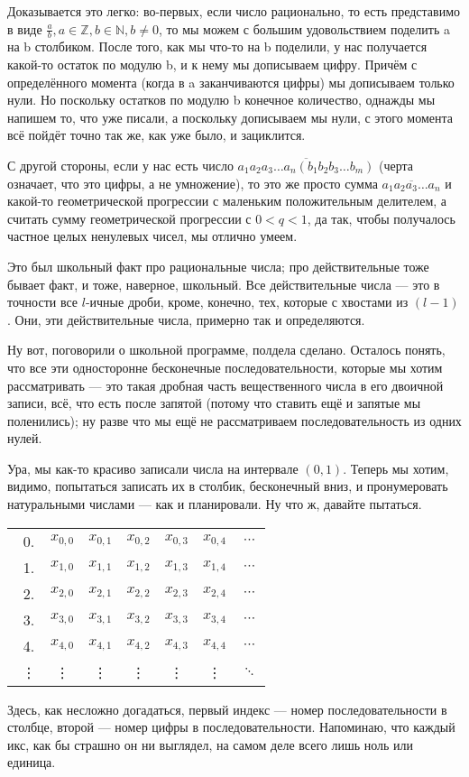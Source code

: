 \documentclass[12pt, onecolumn]{report}
\begin{document}
Доказывается это легко: во-первых, если число рационально, то есть представимо в виде $\frac{a}{b}, a \in \mathbb Z, b \in \mathbb N, b \neq 0$, то мы можем с большим удовольствием поделить a на b столбиком. После того, как мы что-то на b поделили, у нас получается какой-то остаток по модулю b, и к нему мы дописываем цифру. Причём с определённого момента (когда в a заканчиваются цифры) мы дописываем только нули. Но поскольку остатков по модулю b конечное количество, однажды мы напишем то, что уже писали, а поскольку дописываем мы нули, с этого момента всё пойдёт точно так же, как уже было, и зациклится.

С другой стороны, если у нас есть число $\overline{a_1 a_2 a_3 \ldots a_n (b_1 b_2 b_3 \ldots b_m)}$ (черта означает, что это цифры, а не умножение), то это же просто сумма $\overline{a_1 a_2 a_3 \ldots a_n}$ и какой-то геометрической прогрессии с маленьким положительным делителем, а считать сумму геометрической прогрессии с $0 < q < 1$, да так, чтобы получалось частное целых ненулевых чисел, мы отлично умеем.

Это был школьный факт про рациональные числа; про действительные тоже бывает факт, и тоже, наверное, школьный. Все действительные числа --- это в точности все $l$-ичные дроби, кроме, конечно, тех, которые с хвостами из $(l-1)$. Они, эти действительные числа, примерно так и определяются.

Ну вот, поговорили о школьной программе, полдела сделано. Осталось понять, что все эти односторонне бесконечные последовательности, которые мы хотим рассматривать --- это такая дробная часть вещественного числа в его двоичной записи, всё, что есть после запятой (потому что ставить ещё и запятые мы поленились); ну разве что мы ещё не рассматриваем последовательность из одних нулей. 

Ура, мы как-то красиво записали числа на интервале $(0,1)$. Теперь мы хотим, видимо, попытаться записать их в столбик, бесконечный вниз, и пронумеровать натуральными числами --- как и планировали. Ну что ж, давайте пытаться.

\begin{flushleft}
\begin{tabular}{ccccccc}
\ 0. & $x_{0,0}$ & $x_{0,1}$ & $x_{0,2}$ & $x_{0,3}$ & $x_{0,4}$ & $\cdots$ \\
\ 1. & $x_{1,0}$ & $x_{1,1}$ & $x_{1,2}$ & $x_{1,3}$ & $x_{1,4}$ & $\cdots$ \\
\ 2. & $x_{2,0}$ & $x_{2,1}$ & $x_{2,2}$ & $x_{2,3}$ & $x_{2,4}$ & $\cdots$ \\
\ 3. & $x_{3,0}$ & $x_{3,1}$ & $x_{3,2}$ & $x_{3,3}$ & $x_{3,4}$ & $\cdots$ \\
\ 4. & $x_{4,0}$ & $x_{4,1}$ & $x_{4,2}$ & $x_{4,3}$ & $x_{4,4}$ & $\cdots$ \\
\ \vdots & \vdots & \vdots & \vdots & \vdots & \vdots & $\ddots$ \\
\end{tabular}
\end{flushleft}
Здесь, как несложно догадаться, первый индекс --- номер последовательности в столбце, второй --- номер цифры в последовательности. Напоминаю, что каждый икс, как бы страшно он ни выглядел, на самом деле всего лишь ноль или единица.
\end{document}
